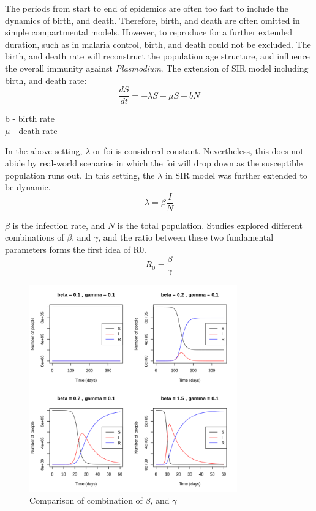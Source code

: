 \documentclass[a4paper, 12pt, twoside]{article}
\begin{document}
The periods from start to end of epidemics are often too fast to include the dynamics of birth, and death.
Therefore, birth, and death are often omitted in simple compartmental models.
However, to reproduce for a further extended duration, such as in malaria control, birth, and death could not be excluded.
The birth, and death rate will reconstruct the population age structure, and influence the overall immunity against \textit{Plasmodium}.
The extension of SIR model including birth, and death rate:
\begin{equation}
  \frac{dS}{dt}=-\lambda S-\mu S+bN
\end{equation} 
\begin{center}
  b - birth rate \\
  $\mu$ - death rate \\
\end{center}  

In the above setting, $\lambda$ or  \gls{foi} is considered constant.
Nevertheless, this does not abide by real-world scenarios in which the \gls{foi} will drop down as the susceptible population runs out.
In this setting, the $\lambda$ in SIR model was further extended to be dynamic.
\begin{equation}
	\lambda = \beta \frac{I}{N}
\end{equation}

$\beta$ is the infection rate, and $N$ is the total population.
Studies explored different combinations of $\beta$, and $\gamma$, and the ratio between these two fundamental parameters forms the first idea of \gls{R0}.
\begin{equation}
	R_0 = \frac{\beta}{\gamma}
\end{equation}
\begin{figure}[htpb]
	\centering
	\includegraphics[width=0.8\textwidth]{sir-model-beta-gamma}
	\caption{Comparison of combination of $\beta$, and $\gamma$}
	\label{fig:sir-model-beta-gamma}
\end{figure}
\end{document}
